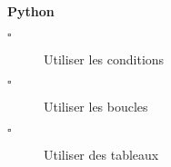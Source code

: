 \begin{titre}[Trigonométrie]

\end{titre}


\begin{CpsCol}
\textbf{Python}
\begin{description}
\item[$\square$] Utiliser les conditions
\item[$\square$] Utiliser les boucles
\item[$\square$] Utiliser des tableaux
\end{description}
\end{CpsCol}


